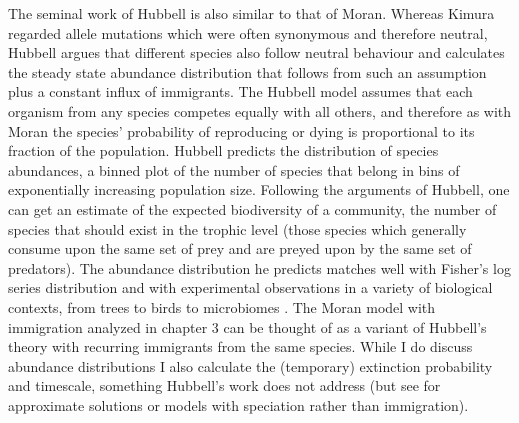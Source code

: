 %
%
The seminal work of Hubbell \cite{Hubbell2001} is also similar to that of Moran. %
Whereas Kimura regarded allele mutations which were often synonymous and therefore neutral, Hubbell argues that different species also follow neutral behaviour and calculates the steady state abundance distribution that follows from such an assumption plus a constant influx of immigrants. %
The Hubbell model assumes that each organism from any species competes equally with all others, and therefore as with Moran the species' probability of reproducing or dying is proportional to its fraction of the population.
Hubbell predicts the distribution of species abundances, a binned plot of the number of species that belong in bins of exponentially increasing population size. 
Following the arguments of Hubbell, one can get an estimate of the expected biodiversity of a community, the number of species that should exist in the trophic level (those species which generally consume upon the same set of prey and are preyed upon by the same set of predators). %
The abundance distribution he predicts matches well with Fisher's log series distribution \cite{Fisher1943,Alonso2004} and with experimental observations in a variety of biological contexts, from trees to birds to microbiomes \cite{Hubbell2001}. 
The Moran model with immigration analyzed in chapter 3 can be thought of as a variant of Hubbell's theory with recurring immigrants from the same species. %
While I do discuss abundance distributions I also calculate the (temporary) extinction probability and timescale, something Hubbell's work does not address (but see \cite{McKane2003,Azaele2005,Pigolotti2013,Kalyuzhny2014,Kessler2015} for approximate solutions or models with speciation rather than immigration). 

